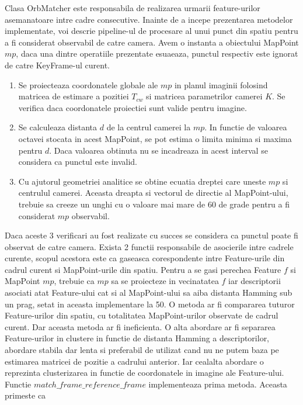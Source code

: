 \documentclass[12pt,a4paper]{report}
\begin{document}
Clasa OrbMatcher este responsabila de realizarea urmarii feature-urilor asemanatoare intre 
cadre consecutive. Inainte de a incepe prezentarea metodelor implementate, voi descrie
pipeline-ul de procesare al unui punct din spatiu pentru a fi considerat observabil de 
catre camera. Avem o instanta a obiectului MapPoint $ mp $, daca una dintre operatiile
prezentate esuaeaza, punctul respectiv este ignorat de catre KeyFrame-ul curent.
\begin{enumerate}
    \item Se proiecteaza coordonatele globale ale $ mp $ in planul imaginii folosind matricea 
de estimare a pozitiei $ T_{cw} $ si matricea parametrilor camerei $ K $. Se verifica daca 
coordonatele proiectiei sunt valide pentru imagine.     
    \item Se calculeaza distanta $ d $ de la centrul camerei la $ mp $. In functie de valoarea 
octavei stocata in acest MapPoint, se pot estima o limita minima si maxima pentru $ d $. 
Daca valoarea obtinuta nu se incadreaza in acest interval se considera ca punctul este invalid.
    \item Cu ajutorul geometriei analitice se obtine ecuatia dreptei care uneste $ mp $ 
si centrulul camerei. Aceasta dreapta si vectorul de directie al MapPoint-ului,
trebuie sa creeze un unghi cu o valoare mai mare de 60 de grade pentru a fi considerat $ mp $
observabil.
\end{enumerate} 
Daca aceste 3 verificari au fost realizate cu succes se considera ca punctul poate fi observat
de catre camera. Exista 2 functii responsabile de asocierile intre cadrele curente, scopul acestora 
este ca gaseasca corespondente intre Feature-urile din cadrul curent si MapPoint-urile 
din spatiu. Pentru a se gasi perechea Feature $ f $ si MapPoint $ mp $, trebuie ca
$ mp $ sa se proiecteze in vecinatatea $ f $ iar descriptorii asociati atat Feature-ului 
cat si al MapPoint-ului sa aiba distanta Hamming sub un prag, setat in aceasta implementare la 50.     
O metoda ar fi compararea tuturor Feature-urilor din spatiu, cu totalitatea MapPoint-urilor 
observate de cadrul curent. Dar aceasta metoda ar fi ineficienta. O alta abordare ar fi separarea
Feature-urilor in clustere in functie de distanta Hamming a descriptorilor, abordare stabila dar 
lenta si preferabil de utilizat cand nu ne putem baza pe estimarea matricei de pozitie a cadrului anterior. 
Iar cealalta abordare o reprezinta clusterizarea in functie de coordonatele in imagine 
ale Feature-ului. \\ 
Functie $ match\_frame\_reference\_frame $ implementeaza prima metoda. Aceasta primeste ca 
\end{document}
